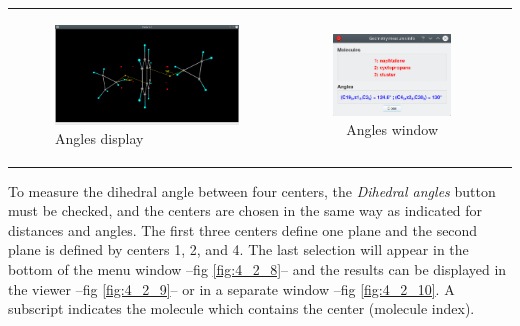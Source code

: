 \documentclass[10pt]{article}
\begin{document}
\begin{tabular}{lcr}
\begin{minipage}{.45\linewidth}
\begin{figure}[H]
\begin{center}
            \includegraphics[width=1\linewidth]{damqt320_angles_2.png}
        \end{center}
        \vspace*{1mm}
        \caption{Angles display \label{fig:4_2_6}}
    \end{figure}
\end{minipage}
&
\begin{minipage}{.25\linewidth}
    \begin{figure}[H]
        \begin{center}
            \vspace*{0mm}
            \includegraphics[width=0.8\linewidth]{damqt320_angles_3.png}
        \end{center}
        \vspace*{17mm}
        \caption{Angles window \label{fig:4_2_7}}
    \end{figure}
\end{minipage}
\end{tabular}

\vspace*{5mm}

To measure the dihedral angle between four centers, 
the {\it Dihedral angles} 
button must be checked, and the centers are chosen in the same way as indicated for 
distances and angles. The first three centers define one plane and the second plane is 
defined by centers 1, 2, and 4.
The last selection will appear in the bottom of the menu window --fig \ref{fig:4_2_8}-- 
and the results can be displayed in the viewer --fig \ref{fig:4_2_9}-- 
or in a separate window --fig \ref{fig:4_2_10}.
A subscript indicates the molecule which contains the center (molecule 
index).
\end{document}
